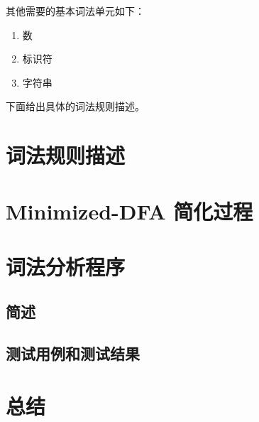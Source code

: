 \documentclass[lang=cn]{elegantpaper}
\begin{document}
其他需要的基本词法单元如下：
\begin{enumerate}
    \item 数
    \item 标识符
    \item 字符串
\end{enumerate}

下面给出具体的词法规则描述。

\section{词法规则描述}


\section{Minimized-DFA 简化过程}

\section{词法分析程序}

\subsection{简述}

\subsection{测试用例和测试结果}

\section{总结}



    

\end{document}

